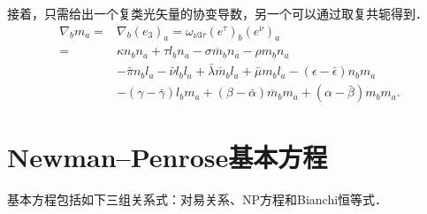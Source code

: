 接着，只需给出一个复类光矢量的协变导数，另一个可以通过取复共轭得到．
\begin{equation}\label{chnull:eqn_covD-m}
    \begin{aligned}
        \nabla_{b} m_a =& \nabla_{b} (e_3)_a =
        \omega_{\nu 3 \tau}(e^\tau)_b (e^\nu)_a  \\
        =&\kappa n_b n_a + \tau l_b n_a
        -\sigma \overline{m}_b n_a - \rho m_b n_a  \\
        & -\bar{\pi} n_b l_a  -\bar{\nu}l_b l_a
        +\bar{\lambda}\overline{m}_b l_a  + \bar{\mu}m_b l_a
        -(\epsilon-\bar{\epsilon})n_b m_a \\
        &  -(\gamma-\bar{\gamma})l_b m_a
        + (\beta-\bar{\alpha})\overline{m}_b m_a+(\alpha-\bar{\beta})m_b m_a .
    \end{aligned}
\end{equation}




\section{Newman--Penrose基本方程}\label{chnull:sec_NP2}
基本方程包括如下三组关系式：对易关系、NP方程和Bianchi恒等式．
